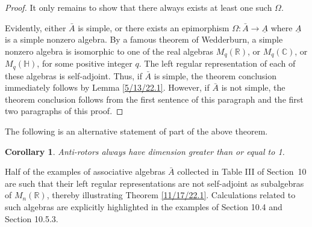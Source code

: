 \documentclass{amsart}
\numberwithin{equation}{section}
\newtheorem{corollary}[theorem]{Corollary}
\theoremstyle{definition}
\numberwithin{theorem}{section}
\begin{document}
\begin{proof}
  It only remains to show that there always exists at least one such $\Omega$. 
  
  Evidently, either $\bar{A}$ is simple, or there exists an epimorphism $\Omega:\bar{A}\rightarrow \underline{A}$ where $ \underline{A}$ is a simple nonzero algebra.   By a famous theorem of Wedderburn, a simple nonzero algebra is isomorphic to one of the real algebras $M_q(\mathbb{R})$, or $M_q(\mathbb{C})$, or $M_q(\mathbb{H})$, for some positive integer $q$.  The left regular representation of each of these algebras is self-adjoint.  Thus, if $\bar{A}$ is simple, the theorem conclusion immediately follows by Lemma \ref{5/13/22.1}.  However, if $\bar{A}$ is not simple, the theorem conclusion follows from the first sentence of this paragraph and the first two paragraphs of this proof.
  \end{proof}

 The following is an alternative statement of part of the above theorem.   
 
 \begin{corollary}\label{1/1/23.1} Anti-rotors always have dimension greater than or equal to 1. \end{corollary}


Half of the examples of associative algebras $\bar{A}$ collected in Table III of \mbox{Section 10} are such that their left regular representations are not self-adjoint as subalgebras of $M_n(\mathbb{R})$, thereby illustrating Theorem \ref{11/17/22.1}.  Calculations related to such algebras are explicitly highlighted in the examples of Section 10.4 and Section 10.5.3.

 
\end{document}
